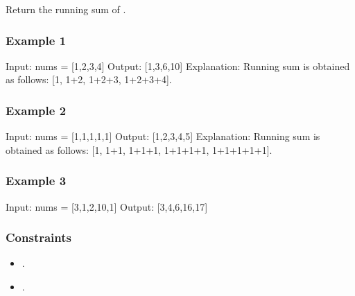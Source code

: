 \documentclass[letterpaper,12pt,english]{book}
\begin{document}
\sphinxAtStartPar
Return the running sum of .


\subsubsection{Example 1}
\label{\detokenize{Prefix_Sum/1480_Running_Sum_of_1d_Array:example-1}}
\begin{sphinxVerbatim}[commandchars=\\\{\}]
Input: nums = [1,2,3,4]
Output: [1,3,6,10]
Explanation: Running sum is obtained as follows: [1, 1+2, 1+2+3, 1+2+3+4].
\end{sphinxVerbatim}


\subsubsection{Example 2}
\label{\detokenize{Prefix_Sum/1480_Running_Sum_of_1d_Array:example-2}}
\begin{sphinxVerbatim}[commandchars=\\\{\}]
Input: nums = [1,1,1,1,1]
Output: [1,2,3,4,5]
Explanation: Running sum is obtained as follows: [1, 1+1, 1+1+1, 1+1+1+1, 1+1+1+1+1].
\end{sphinxVerbatim}


\subsubsection{Example 3}
\label{\detokenize{Prefix_Sum/1480_Running_Sum_of_1d_Array:example-3}}
\begin{sphinxVerbatim}[commandchars=\\\{\}]
Input: nums = [3,1,2,10,1]
Output: [3,4,6,16,17]
\end{sphinxVerbatim}


\subsubsection{Constraints}
\label{\detokenize{Prefix_Sum/1480_Running_Sum_of_1d_Array:constraints}}\begin{itemize}
\item {} 
\sphinxAtStartPar
{}.

\item {} 
\sphinxAtStartPar
{}.

\end{itemize}
\end{document}
